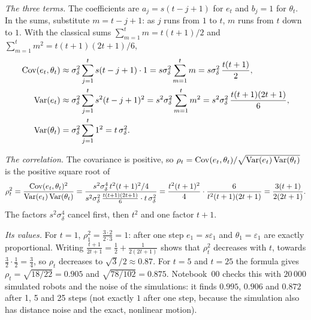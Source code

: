 \emph{The three terms.} The coefficients are $a_j=s(t-j+1)$ for $e_t$ and
$b_j=1$ for $\theta_t$. In the sums, substitute $m=t-j+1$: as $j$ runs
from $1$ to $t$, $m$ runs from $t$ down to $1$. With the classical sums
$\sum_{m=1}^tm=t(t+1)/2$ and $\sum_{m=1}^tm^2=t(t+1)(2t+1)/6$,
\begin{align*}
  \operatorname{Cov}(e_t,\theta_t)&\approx\sigma_\delta^2\sum_{j=1}^ts(t-j+1)\cdot1
  =s\sigma_\delta^2\sum_{m=1}^tm=s\sigma_\delta^2\,\frac{t(t+1)}2,\\
  \operatorname{Var}(e_t)&\approx\sigma_\delta^2\sum_{j=1}^ts^2(t-j+1)^2
  =s^2\sigma_\delta^2\sum_{m=1}^tm^2
  =s^2\sigma_\delta^2\,\frac{t(t+1)(2t+1)}6,\\
  \operatorname{Var}(\theta_t)&=\sigma_\delta^2\sum_{j=1}^t1^2=t\,\sigma_\delta^2 .
\end{align*}

\emph{The correlation.} The covariance is positive, so
$\rho_t=\operatorname{Cov}(e_t,\theta_t)/\sqrt{\operatorname{Var}(e_t)\operatorname{Var}(\theta_t)}$ is the
positive square root of
\[
  \rho_t^2=\frac{\operatorname{Cov}(e_t,\theta_t)^2}{\operatorname{Var}(e_t)\operatorname{Var}(\theta_t)}
  =\frac{s^2\sigma_\delta^4\,t^2(t+1)^2/4}
        {s^2\sigma_\delta^2\,\frac{t(t+1)(2t+1)}6\cdot t\,\sigma_\delta^2}
  =\frac{t^2(t+1)^2}4\cdot\frac6{t^2(t+1)(2t+1)}
  =\frac{3(t+1)}{2(2t+1)} .
\]
The factors $s^2\sigma_\delta^4$ cancel first, then $t^2$ and one factor
$t+1$.

\emph{Its values.} For $t=1$, $\rho_1^2=\frac{3\cdot2}{2\cdot3}=1$:
after one step $e_1=s\varepsilon_1$ and $\theta_1=\varepsilon_1$ are
exactly proportional. Writing
$\frac{t+1}{2t+1}=\frac12+\frac1{2(2t+1)}$ shows that $\rho_t^2$
decreases with $t$, towards $\frac32\cdot\frac12=\frac34$, so $\rho_t$
decreases to $\sqrt3/2\approx0.87$. For $t=5$ and $t=25$ the formula
gives $\rho_t=\sqrt{18/22}=0.905$ and $\sqrt{78/102}=0.875$.
Notebook~00 checks this with $20\,000$ simulated robots and the noise of
the simulations: it finds $0.995$, $0.906$ and $0.872$ after 1, 5 and 25
steps (not exactly $1$ after one step, because the simulation also has
distance noise and the exact, nonlinear motion).

